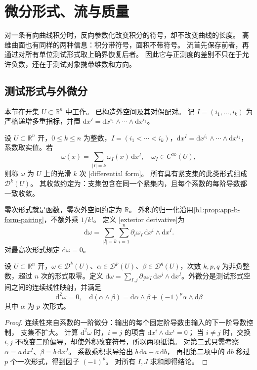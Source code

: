 \section{微分形式、流与质量}
\label{b1:sec:D102}

对一条有向曲线积分时，反向参数化改变积分的符号，却不改变曲线的长度。
高维曲面也有同样的两种信息：积分带符号，面积不带符号。
流首先保存前者，再通过对所有单位测试形式取上确界恢复后者。
因此它与正测度的差别不只在于允许负数，还在于测试对象携带维数和方向。

\subsection{测试形式与外微分}
\label{b1:subsec:D10201}

本节在开集 \(U\subset\mathbb R^n\) 中工作。
已构造外空间及其对偶配对。
记 \(I=(i_1,\ldots,i_k)\) 为严格递增多重指标，并置
\(\mathrm{d}x^I=\mathrm{d}x^{i_1}\wedge\cdots\wedge \mathrm{d}x^{i_k}\)。

\begin{definition}\label{b1:def:app-d-differential-form}
设 \(U\subset\mathbb R^n\) 开，\(0\le k\le n\) 为整数，\(I=(i_1<\cdots<i_k)\)，\(\mathrm dx^I=\mathrm dx^{i_1}\wedge\cdots\wedge\mathrm dx^{i_k}\)，系数取实值。若
\[
 \omega(x)=\sum_{|I|=k}\omega_I(x)\,\mathrm{d}x^I,
 \quad \omega_I\in C^\infty(U),
\]
则称 \(\omega\) 为 \(U\) 上的光滑 \(k\) 次%
[differential form]。
所有具有紧支集的此类形式组成 \(\mathcal D^k(U)\)。
其收敛约定为：支集包含在同一个紧集内，且每个系数的每阶导数都一致收敛。
\end{definition}

零次形式就是函数，零次外空间约定为 \(\mathbb R\)。
外积的归一化沿用\cref{b1:prop:app-b-form-pairing}，不额外乘 \(1/k!\)。
定义%
[exterior derivative]为
\[
 \mathrm{d}\omega=\sum_{|I|=k}\sum_{i=1}^n
       \partial_i\omega_I\,\mathrm{d}x^i\wedge \mathrm{d}x^I.
\]
对最高次形式规定 \(\mathrm{d}\omega=0\)。

\begin{proposition}\label{b1:prop:app-d-exterior-derivative}
设 \(U\subset\mathbb R^n\) 开，\(\omega\in\mathcal D^k(U)\)、\(\alpha\in\mathcal D^p(U)\)、\(\beta\in\mathcal D^q(U)\)，次数 \(k,p,q\) 为非负整数，超过 \(n\) 次的形式取零。定义 \(\mathrm d\omega=\sum_{I,j}\partial_j\omega_I\,\mathrm dx^j\wedge\mathrm dx^I\)。外微分是测试形式空间之间的连续线性映射，并满足
\[
 \mathrm{d}^2\omega=0,\quad
 \mathrm{d}(\alpha\wedge\beta)
   =\mathrm{d}\alpha\wedge\beta+(-1)^p\alpha\wedge \mathrm{d}\beta
\]
其中 \(\alpha\) 为 \(p\) 次形式。
\end{proposition}
\begin{proof}
连续性来自系数的一阶微分：输出的每个固定阶导数由输入的下一阶导数控制，
支集不扩大。
计算 \(\mathrm{d}^2\omega\) 时，\(i=j\) 的项含 \(\mathrm{d}x^i\wedge \mathrm{d}x^i=0\)；
当 \(i\neq j\) 时，交换 \(i,j\) 不改变二阶偏导，却使外积改变符号，所以两项抵消。
对第二式只需考察
\(\alpha=a\,\mathrm{d}x^I\)、\(\beta=b\,\mathrm{d}x^J\)。
系数乘积求导给出 \(b\,\mathrm{d}a+a\,\mathrm{d}b\)，
再把第二项中的 \(\mathrm{d}b\) 移过 \(p\) 个一次形式，得到因子 \((-1)^p\)。
对所有 \(I,J\) 求和即得结论。
\end{proof}

